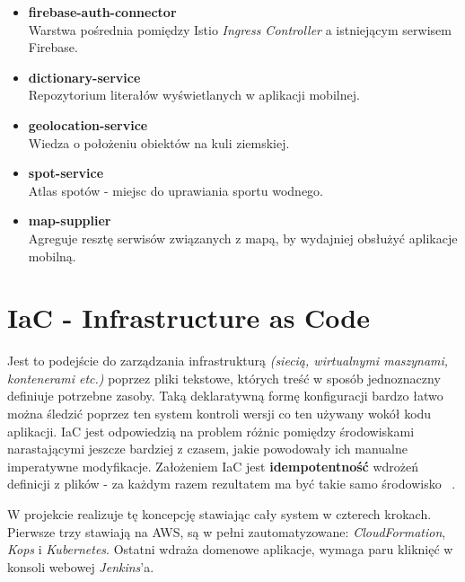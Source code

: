 \begin{itemize}
    \item
    \textbf{firebase-auth-connector}\\ 
    Warstwa pośrednia pomiędzy Istio \emph{Ingress Controller} a istniejącym serwisem Firebase.
    
    \item
    \textbf{dictionary-service}\\ 
    Repozytorium literałów wyświetlanych w aplikacji mobilnej.

    \item
    \textbf{geolocation-service}\\ 
    Wiedza o położeniu obiektów na kuli ziemskiej.

    \item
    \textbf{spot-service}\\ 
    Atlas spotów - miejsc do uprawiania sportu wodnego.

    \item
    \textbf{map-supplier}\\ 
    Agreguje resztę serwisów związanych z mapą, by wydajniej obsłużyć aplikacje mobilną.
\end{itemize} 




\section{IaC - Infrastructure as Code}
\label{iac:section}

Jest to podejście do zarządzania infrastrukturą \emph{(siecią, wirtualnymi maszynami, kontenerami etc.)} poprzez pliki tekstowe, 
których treść w sposób jednoznaczny definiuje potrzebne zasoby. 
Taką deklaratywną formę konfiguracji bardzo łatwo można śledzić poprzez ten system kontroli wersji co ten używany wokół kodu aplikacji.
IaC jest odpowiedzią na problem różnic pomiędzy środowiskami narastającymi jeszcze bardziej z czasem, jakie powodowały ich manualne imperatywne modyfikacje.
Założeniem IaC jest \textbf{idempotentność} wdrożeń definicji z plików - za każdym razem rezultatem ma być takie samo środowisko ~\cite{iac-ms}.

W projekcie realizuje tę koncepcję stawiając cały system w czterech krokach. 
Pierwsze trzy stawiają  na AWS, są w pełni zautomatyzowane: \emph{CloudFormation}, \emph{Kops} i \emph{Kubernetes}.
Ostatni wdraża domenowe aplikacje, wymaga paru kliknięć w konsoli webowej \emph{Jenkins}'a. 

